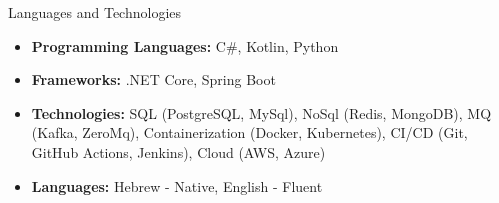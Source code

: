 \documentclass[]{mcdowellcv}
\begin{document}
	\begin{cvsection}{Languages and Technologies}
		\begin{cvsubsection}{}{}{}	
			\begin{itemize}
				\item \textbf{Programming Languages:} C\#, Kotlin, Python
				\item \textbf{Frameworks:} .NET Core, Spring Boot
				\item \textbf{Technologies:} SQL (PostgreSQL, MySql), NoSql (Redis, MongoDB), MQ (Kafka, ZeroMq), \linebreak Containerization (Docker, Kubernetes), CI/CD (Git, GitHub Actions, Jenkins), Cloud (AWS, Azure)
				\item \textbf{Languages:} Hebrew - Native, English - Fluent
			\end{itemize}
		\end{cvsubsection}
	\end{cvsection}
	
\end{document}
